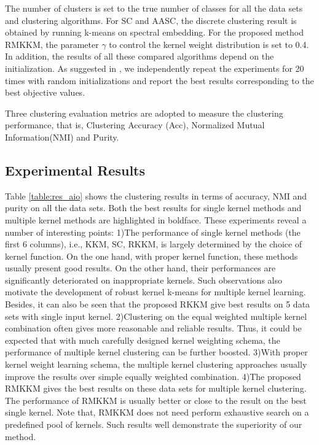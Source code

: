 \documentclass{article}
\begin{document}
The number of clusters is set to the true number of classes for all the data sets and clustering algorithms. For SC and AASC, the discrete clustering result is obtained by running k-means on spectral embedding. For the proposed method RMKKM,  the parameter $\gamma$ to control the kernel weight distribution is set to 0.4. In addition, the results of all these compared algorithms depend on the initialization. As suggested in \cite{yang2010image}, we independently repeat the experiments for 20 times with random initializations and report the best results corresponding to the best objective values.

Three clustering evaluation metrics are adopted to measure the clustering performance, that is, Clustering Accuracy (Acc), Normalized Mutual Information(NMI) and Purity.

\subsection{Experimental Results}
Table \ref{table:res_aio} shows the clustering results in terms of accuracy, NMI and purity on all the data sets. Both the best results for single kernel methods and multiple kernel methods are highlighted in boldface. These experiments reveal a number of interesting points: 1)The performance of single kernel methods (the first 6 columns), i.e., KKM, SC, RKKM, is largely determined by the choice of kernel function. On the one hand, with proper kernel function, these methods usually present good results. On the other hand, their performances are significantly deteriorated on inappropriate kernels. Such observations also motivate the development of robust kernel k-means for multiple kernel learning. Besides, it can also be seen that the proposed RKKM give best results on 5 data sets with single input kernel. 2)Clustering on the equal weighted multiple kernel combination often gives more reasonable and reliable results. Thus, it could be expected that with much carefully designed kernel weighting schema, the performance of multiple kernel clustering can be further boosted. 3)With proper kernel weight learning schema, the multiple kernel clustering approaches usually improve the results over simple equally weighted combination. 4)The proposed RMKKM gives the best results on these data sets for multiple kernel clustering. The performance of RMKKM is usually better or close to the result on the best single kernel. Note that, RMKKM does not need perform exhaustive search on a predefined pool of kernels. Such results well demonstrate the superiority of our method.
\end{document}
